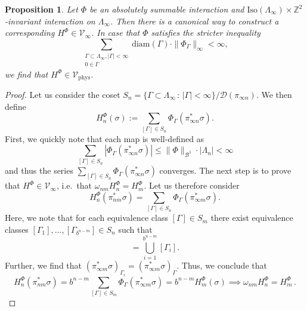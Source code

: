 \documentclass{article}
\newtheorem{proposition}[theorem]{Proposition}
\newcommand{\Iso}{\mathrm{Iso}}
\newcommand{\diam}{\mathrm{diam}}
\newcommand{\phys}{\mathrm{phys}}
\begin{document}
\begin{proposition}
    Let $\Phi$ be an absolutely summable interaction and $\Iso(\Lambda_\infty)\times\mathds{Z}^2$-invariant interaction on $\Lambda_\infty$. Then there is a canonical way to construct a corresponding $H^\Phi\in \mathcal{V}_\infty$. In case that $\Phi$ satisfies the stricter inequality
    \begin{equation}\label{Eq1}
        \sum_{\substack{\Gamma\subset\Lambda_\infty,|\Gamma|<\infty\\0\in\Gamma}}\diam(\Gamma)\cdot\|\Phi_\Gamma\|_\infty<\infty,
    \end{equation}
    we find that $H^\Phi\in \mathcal{V}_\phys$.
\end{proposition}

\begin{proof}
    Let us consider the coset $S_n=\{\Gamma\subset\Lambda_\infty\,:\,|\Gamma|<\infty\}/\mathcal{D}(\pi_{\infty n})$. We then define
    \begin{equation}
        H^{\Phi}_n(\sigma):=\sum_{[\Gamma]\in S_n}\Phi_\Gamma(\pi_{\infty n}^*\sigma).
    \end{equation}
    First, we quickly note that each map is well-defined as 
    \begin{equation}
        \sum_{[\Gamma]\in S_n}|\Phi_\Gamma(\pi_{\infty n}^*\sigma)|\leq\|\Phi\|_{\mathcal{B}^1}\cdot|\Lambda_n|<\infty
    \end{equation}
    and thus the series $\sum_{[\Gamma]\in S_n}\Phi_\Gamma(\pi_{\infty n}^*\sigma)$ converges. The next step is to prove that $H^\Phi\in \mathcal{V}_\infty$, i.e.\ that $\omega_{nm}H_n^\Phi=H_m^\Phi$. Let us therefore consider
    \begin{equation}
        H_n^\Phi(\pi_{nm}^*\sigma)=\sum_{[\Gamma]\in S_n}\Phi_\Gamma(\pi_{\infty m}^*\sigma).
    \end{equation}
    Here, we note that for each equivalence class $[\Gamma]\in S_m$ there exist equivalence classes $[\Gamma_1],...,[\Gamma_{b^{n-m}}]\in S_n$ such that
    \begin{equation}
        [\Gamma]=\bigcup_{i=1}^{b^{n-m}}[\Gamma_i].
    \end{equation}
    Further, we find that $(\pi_{\infty m}^*\sigma)_{\Gamma_i}=(\pi_{\infty m}^*\sigma)_\Gamma$. Thus, we conclude that
    \begin{equation}
        H_n^\Phi(\pi_{nm}^*\sigma)=b^{n-m}\sum_{[\Gamma]\in S_m}\Phi_\Gamma(\pi_{\infty m}^*\sigma)=b^{n-m}H_{m}^\Phi(\sigma)\implies\omega_{nm}H_n^\Phi=H_m^\Phi\,.
    \end{equation}

\end{proof}
\end{document}
